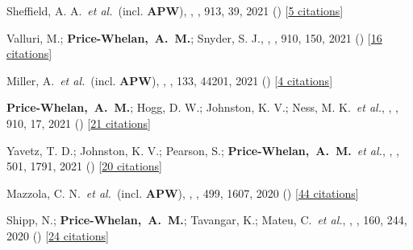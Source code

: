 {\item[{\color{deemph}\scriptsize84}]Sheffield, A. A.~\textit{et al.}~(incl. \textbf{APW}), , \apj, 913, 39, 2021 () [\href{http://adsabs.harvard.edu/abs/2021ApJ...913...39S}{5 citations}]

\item[{\color{deemph}\scriptsize83}]Valluri, M.; \textbf{Price-Whelan,~A.~M.}; Snyder, S. J., , \apj, 910, 150, 2021 () [\href{http://adsabs.harvard.edu/abs/2021ApJ...910..150V}{16 citations}]

\item[{\color{deemph}\scriptsize82}]Miller, A.~\textit{et al.}~(incl. \textbf{APW}), , \pasp, 133, 44201, 2021 () [\href{http://adsabs.harvard.edu/abs/2021PASP..133d4201M}{4 citations}]

\item[{\color{deemph}\scriptsize81}]\textbf{Price-Whelan,~A.~M.}; Hogg, D. W.; Johnston, K. V.; Ness, M. K.~\textit{et al.}, , \apj, 910, 17, 2021 () [\href{http://adsabs.harvard.edu/abs/2021ApJ...910...17P}{21 citations}]

\item[{\color{deemph}\scriptsize80}]Yavetz, T. D.; Johnston, K. V.; Pearson, S.; \textbf{Price-Whelan,~A.~M.}~\textit{et al.}, , \mnras, 501, 1791, 2021 () [\href{http://adsabs.harvard.edu/abs/2021MNRAS.501.1791Y}{20 citations}]

\item[{\color{deemph}\scriptsize79}]Mazzola, C. N.~\textit{et al.}~(incl. \textbf{APW}), , \mnras, 499, 1607, 2020 () [\href{http://adsabs.harvard.edu/abs/2020MNRAS.499.1607M}{44 citations}]

\item[{\color{deemph}\scriptsize78}]Shipp, N.; \textbf{Price-Whelan,~A.~M.}; Tavangar, K.; Mateu, C.~\textit{et al.}, , \aj, 160, 244, 2020 () [\href{http://adsabs.harvard.edu/abs/2020AJ....160..244S}{24 citations}]

}
